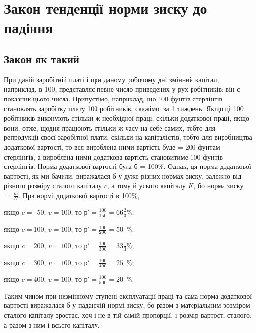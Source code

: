 

\chapter{Закон тенденції норми зиску до падіння}

\section{Закон як такий}

При даній заробітній платі і при даному робочому дні змінний
капітал, наприклад, в 100, представляє певне число приведених
у рух робітників; він є показник цього числа. Припустімо,
наприклад, що 100 фунтів стерлінгів становлять заробітку плату
100 робітників, скажімо, за 1 тиждень. Якщо ці 100 робітників
виконують стільки ж необхідної праці, скільки додаткової праці,
якщо вони, отже, щодня працюють стільки ж часу на себе
самих, тобто для репродукції своєї заробітної плати, скільки
на капіталістів, тобто для виробництва додаткової вартості, то
вся вироблена ними вартість буде = 200 фунтам стерлінгів,
а вироблена ними додаткова вартість становитиме 100 фунтів
стерлінгів. Норма додаткової вартості  була б = 100\%. Однак,
ця норма додаткової вартості, як ми бачили, виражалася б у дуже
різних нормах зиску, залежно від різного розміру сталого капіталу
$c$, а тому й усього капіталу $K$, бо норма зиску $ = \frac{m}{K}$. При нормі
додаткової вартості в 100\%,

\begin{center}
якщо $c = \phantom{0}50$, $v = 100$, то $р' = \frac{100}{150} = 66\frac{2}{3}\%$;

якщо $c = 100$, $v = 100$, то $р' = \frac{100}{200} = 50\phantom{\frac{1}{1}}\%$;

якщо $c = 200$, $v = 100$, то $р' = \frac{100}{300} = 33\frac{1}{3}\%$;

якщо $c = 300$, $v = 100$, то $р' = \frac{100}{400} = 25\phantom{\frac{1}{1}}\%$;

якщо $c = 400$, $v = 100$, то $р' = \frac{100}{500} = 20\phantom{\frac{1}{1}}\%$.
\end{center}

Таким чином при незмінному ступені експлуатації праці та
сама норма додаткової вартості виражалася б у падаючій нормі
зиску, бо разом з матеріальним розміром сталого капіталу зростає,
хоч і не в тій самій пропорції, і розмір вартості сталого,
а разом з ним і всього капіталу.

